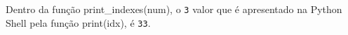 \documentclass[12pt,varwidth=16cm,border=1pt]{standalone}
\begin{document}
Dentro da função print\_indexes(num), o \verb+3+ valor que é apresentado na Python Shell pela função print(idx), é \verb+33+.

\questiomtrue
\end{document}
